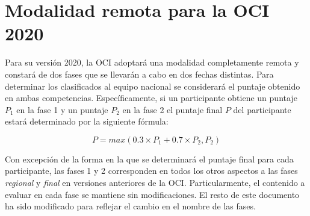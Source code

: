 \documentclass{article}
\newcommand{\new}{\color{red}}
\begin{document}
{\new
\section{Modalidad remota para la OCI 2020}
Para su versión 2020, la OCI adoptará una modalidad completamente remota y constará de dos fases
que se llevarán a cabo en dos fechas distintas.
Para determinar los clasificados al equipo nacional se considerará el puntaje obtenido en ambas
competencias.
Específicamente, si un participante obtiene un puntaje $P_1$ en la fase 1 y un puntaje
$P_2$ en la fase 2 el puntaje final $P$ del participante estará determinado por la siguiente fórmula:

$$
P = max(0.3\times P_1 + 0.7\times P_2, P_2)
$$

Con excepción de la forma en la que se determinará el puntaje final para cada participante, las fases
1 y 2 corresponden en todos los otros aspectos a las fases \emph{regional} y \emph{final} en versiones anteriores de la
OCI.
Particularmente, el contenido a evaluar en cada fase se mantiene sin modificaciones.
El resto de este documento ha sido modificado para reflejar el cambio en el nombre de las fases.
}
\end{document}
